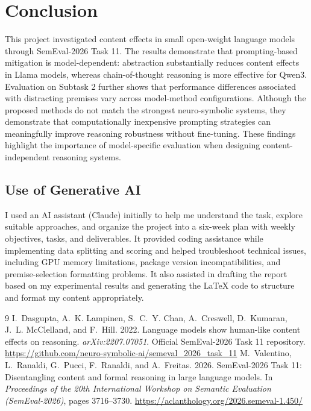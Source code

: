 \documentclass[11pt,letterpaper]{article}
\begin{document}
\section{Conclusion}
This project investigated content effects in small open-weight language models through SemEval-2026 Task 11. The results demonstrate that prompting-based mitigation is model-dependent: abstraction substantially reduces content effects in Llama models, whereas chain-of-thought reasoning is more effective for Qwen3. Evaluation on Subtask 2 further shows that performance differences associated with distracting premises vary across model-method configurations. Although the proposed methods do not match the strongest neuro-symbolic systems, they demonstrate that computationally inexpensive prompting strategies can meaningfully improve reasoning robustness without fine-tuning. These findings highlight the importance of model-specific evaluation when designing content-independent reasoning systems.

\subsection*{Use of Generative AI}
I used an AI assistant (Claude) initially to help me understand the task, explore suitable approaches, and organize the project into a six-week plan with weekly objectives, tasks, and deliverables. It provided coding assistance while implementing data splitting and scoring and helped troubleshoot technical issues, including GPU memory limitations, package version incompatibilities, and premise-selection formatting problems. It also assisted in drafting the report based on my experimental results and generating the LaTeX code to structure and format my content appropriately.

\small
\begin{thebibliography}{9}\setlength{\itemsep}{1pt}
 I.~Dasgupta, A.~K. Lampinen, S.~C.~Y. Chan, A.~Creswell, D.~Kumaran, J.~L. McClelland, and F.~Hill. 2022. Language models show human-like content effects on reasoning. \textit{arXiv:2207.07051}.
 Official SemEval-2026 Task 11 repository. \url{https://github.com/neuro-symbolic-ai/semeval_2026_task_11}
 M.~Valentino, L.~Ranaldi, G.~Pucci, F.~Ranaldi, and A.~Freitas. 2026. SemEval-2026 Task 11: Disentangling content and formal reasoning in large language models. In \textit{Proceedings of the 20th International Workshop on Semantic Evaluation (SemEval-2026)}, pages 3716--3730. \url{https://aclanthology.org/2026.semeval-1.450/}
\end{thebibliography}
\end{document}
